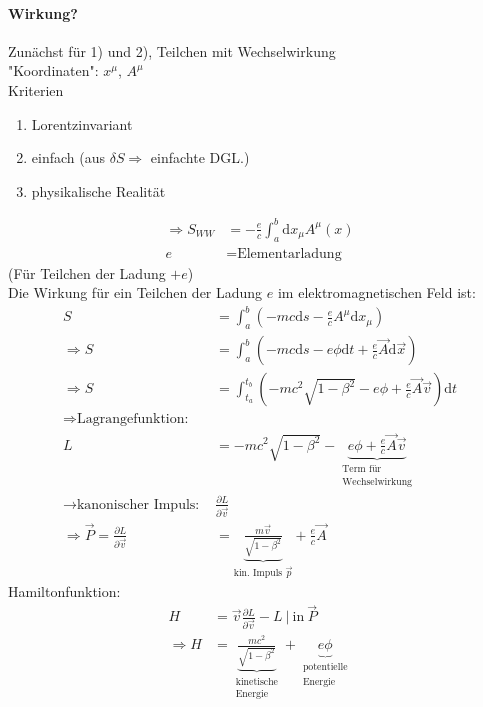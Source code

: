\documentclass[a4paper]{article}
\begin{document}
\paragraph{Wirkung?\newline}
Zunächst für 1) und 2), Teilchen mit Wechselwirkung\\
"Koordinaten": $x^\mu$, $A^\mu$\\
Kriterien
\begin{enumerate}
  \item Lorentzinvariant
  \item einfach (aus $\delta\!S \Rightarrow$ einfachte DGL.)
  \item physikalische Realität
\end{enumerate}
\begin{align}
  \Rightarrow S_{WW}&=-\frac{e}{c}\int_a^b \mathrm{d}x_\mu A^\mu(x)\\
  e&=\text{Elementarladung}
\end{align}
(Für Teilchen der Ladung $+e$)\\
Die Wirkung für ein Teilchen der Ladung $e$ im elektromagnetischen Feld ist:
\begin{align}
S&=\int^b_a\left(-mc\mathrm{d}s-\frac{e}{c}A^\mu \mathrm{d}x_\mu\right)\\
\Rightarrow S&=\int^b_a\left(-mc\mathrm{d}s-e\phi \mathrm{d}t +\frac{e}{c}\vec{A}\mathrm{d}\vec{x}\right)\\
\Rightarrow S&=\int^{t_b}_{t_a}\left(-mc^2\sqrt{1-\beta^2}-e\phi
+\frac{e}{c}\vec{A}\vec{v}\right) \mathrm{d}t\\
\nonumber\Rightarrow \text{Lagrangefunktion:}&\\
L&=-mc^2\sqrt{1-\beta^2}-\underbrace{e\phi+\frac{e}{c}\vec{A}\vec{v}}_{\substack{\text{Term
für}\\\text{Wechselwirkung}}}\\
\rightarrow \text{kanonischer Impuls: } &\frac{\partial L}{\partial \vec{v}}\\
\Rightarrow \vec{P}=\frac{\partial L}{\partial
\vec{v}}&=\underbrace{\frac{m\vec{v}}{\sqrt{1-\beta^2}}}_{\text{kin. Impuls }
\vec{p}}+\frac{e}{c}\vec{A}
\end{align} 
Hamiltonfunktion:
\begin{align}
H&=\vec{v}\frac{\partial L}{\partial \vec{v}}-L\ |\ \text{in}\ \vec{P}\\
\Rightarrow
H&=\underbrace{\frac{mc^2}{\sqrt{1-\beta^2}}}_{\substack{\text{kinetische}\\
\text{Energie}}}+ \underbrace{e\phi}_{\substack{\text{potentielle}\\
\text{Energie}}}
\end{align}
\end{document}
